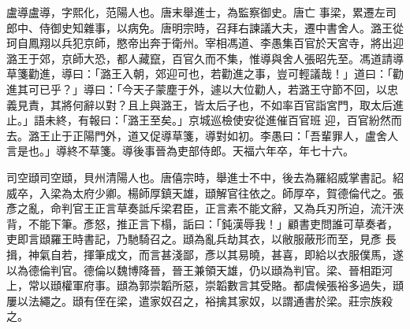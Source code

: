 \begin{pinyinscope}
 盧導盧導，字熙化，范陽人也。唐末舉進士，為監察御史。唐亡
 事梁，累遷左司郎中、侍御史知雜事，以病免。唐明宗時，召拜右諫議大夫，遷中書舍人。潞王從珂自鳳翔以兵犯京師，愍帝出奔于衛州。宰相馮道、李愚集百官於天宮寺，將出迎潞王于郊，京師大恐，都人藏竄，百官久而不集，惟導與舍人張昭先至。馮道請導草箋勸進，導曰：「潞王入朝，郊迎可也，若勸進之事，豈可輕議哉！」道曰：「勸進其可已乎？」導曰：「今天子蒙塵于外，遽以大位勸人，若潞王守節不回，以忠義見責，其將何辭以對？且上與潞王，皆太后子也，不如率百官詣宮門，取太后進止。」語未終，有報曰：「潞王至矣。」京城巡檢使安從進催百官班
 迎，百官紛然而去。潞王止于正陽門外，道又促導草箋，導對如初。李愚曰：「吾輩罪人，盧舍人言是也。」導終不草箋。導後事晉為吏部侍郎。天福六年卒，年七十六。



 司空頲司空頲，貝州清陽人也。唐僖宗時，舉進士不中，後去為羅紹威掌書記。紹威卒，入梁為太府少卿。楊師厚鎮天雄，頲解官往依之。師厚卒，賀德倫代之。張彥之亂，命判官王正言草奏詆斥梁君臣，正言素不能文辭，又為兵刃所迫，流汗浹背，不能下筆。彥怒，推正言下榻，詬曰：「鈍漢辱我！」顧書吏問誰可草奏者，吏即言頲羅王時書記，乃馳騎召之。頲為亂兵劫其衣，以敝服蔽形而至，見彥
 長揖，神氣自若，揮筆成文，而言甚淺鄙，彥以其易曉，甚喜，即給以衣服僕馬，遂以為德倫判官。德倫以魏博降晉，晉王兼領天雄，仍以頲為判官。梁、晉相距河上，常以頲權軍府事。頲為郭崇韜所惡，崇韜數言其受賂。都虞候張裕多過失，頲屢以法繩之。頲有侄在梁，遣家奴召之，裕擒其家奴，以謂通書於梁。莊宗族殺之。



\end{pinyinscope}